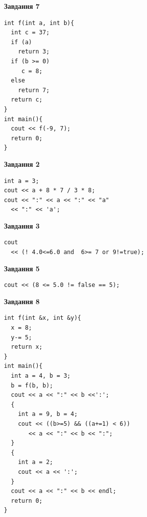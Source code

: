 \documentclass[12pt, ukrainian]{article}
\begin{document}
{\begin {large}
\begin{minipage}[t]{7.0cm}
\begin{center}
\textbf{Завдання 7}
\end{center}
\vspace{-8mm}

\begin{verbatim}
int f(int a, int b){
  int c = 37;
  if (a)
    return 3;
  if (b >= 0)
     c = 8;
  else
    return 7;
  return c;
}
int main(){
  cout << f(-9, 7);
  return 0;
}
\end{verbatim}

\end{minipage}
\vline \hspace{1mm}
\begin{minipage}[t]{11.0cm}

\begin{center}
\textbf{Завдання 2}
\end{center}
\vspace{-8mm}

\begin{verbatim}
int a = 3;
cout << a + 8 * 7 / 3 * 8;
cout << ":" << a << ":" << "a" 
  << ":" << 'a';
\end{verbatim}



\begin{center}
\textbf{Завдання 3}
\end{center}
\vspace{-8mm}

\begin{verbatim}
cout 
  << (! 4.0<=6.0 and  6>= 7 or 9!=true);
\end{verbatim}



\begin{center}
\textbf{Завдання 5}
\end{center}
\vspace{-8mm}

\begin{verbatim}
cout << (8 <= 5.0 != false == 5);
\end{verbatim}



\begin{center}
\textbf{Завдання 8}
\end{center}
\vspace{-8mm}

\begin{verbatim}
int f(int &x, int &y){
  x = 8;
  y-= 5;
  return x;
}
int main(){
  int a = 4, b = 3;
  b = f(b, b);
  cout << a << ":" << b <<':';
  {
    int a = 9, b = 4;
    cout << ((b>=5) && ((a+=1) < 6))
       << a << ":" << b << ":";
  }
  {
    int a = 2;
    cout << a << ':';
  }
  cout << a << ":" << b << endl;
  return 0;
}
\end{verbatim}


\end{minipage}
\end{large}}
\end{document}
